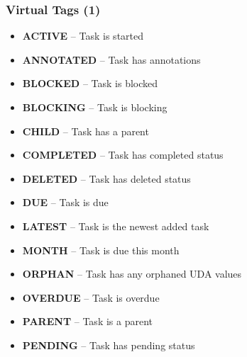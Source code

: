 \documentclass[t,handout]{beamer}
\begin{document}
\begin{frame}[fragile]\frametitle{Virtual Tags (1)}
    \vfill
    \begin{itemize}
        \item \textbf{ACTIVE}       -- Task is started
        \item \textbf{ANNOTATED}    -- Task has annotations
        \item \textbf{BLOCKED}      -- Task is blocked
        \item \textbf{BLOCKING}     -- Task is blocking
        \item \textbf{CHILD}        -- Task has a parent
        \item \textbf{COMPLETED}    -- Task has completed status
        \item \textbf{DELETED}      -- Task has deleted status
        \item \textbf{DUE}          -- Task is due
        \item \textbf{LATEST}       -- Task is the newest added task
        \item \textbf{MONTH}        -- Task is due this month
        \item \textbf{ORPHAN}       -- Task has any orphaned UDA values
        \item \textbf{OVERDUE}      -- Task is overdue
        \item \textbf{PARENT}       -- Task is a parent
        \item \textbf{PENDING}      -- Task has pending status
    \end{itemize}
\end{frame}
\end{document}
